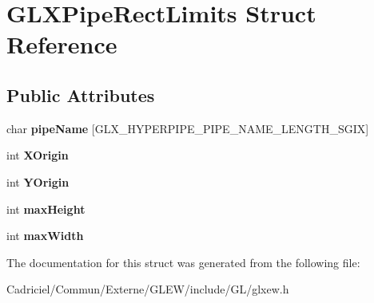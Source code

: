 \hypertarget{struct_g_l_x_pipe_rect_limits}{\section{G\-L\-X\-Pipe\-Rect\-Limits Struct Reference}
\label{struct_g_l_x_pipe_rect_limits}
}
\subsection*{Public Attributes}
\begin{DoxyCompactItemize}
\item 
\hypertarget{struct_g_l_x_pipe_rect_limits_ae78b4b6656101bc841946733a5b6e5ce}{char {\bfseries pipe\-Name} \mbox{[}G\-L\-X\-\_\-\-H\-Y\-P\-E\-R\-P\-I\-P\-E\-\_\-\-P\-I\-P\-E\-\_\-\-N\-A\-M\-E\-\_\-\-L\-E\-N\-G\-T\-H\-\_\-\-S\-G\-I\-X\mbox{]}}\label{struct_g_l_x_pipe_rect_limits_ae78b4b6656101bc841946733a5b6e5ce}

\item 
\hypertarget{struct_g_l_x_pipe_rect_limits_a3e5a965059d9f5d2ca42acd35af5bb9b}{int {\bfseries X\-Origin}}\label{struct_g_l_x_pipe_rect_limits_a3e5a965059d9f5d2ca42acd35af5bb9b}

\item 
\hypertarget{struct_g_l_x_pipe_rect_limits_a50e06bcf0dae95854be7d93a515199e9}{int {\bfseries Y\-Origin}}\label{struct_g_l_x_pipe_rect_limits_a50e06bcf0dae95854be7d93a515199e9}

\item 
\hypertarget{struct_g_l_x_pipe_rect_limits_a27572e499c0d3280031c2ad8e387c0c1}{int {\bfseries max\-Height}}\label{struct_g_l_x_pipe_rect_limits_a27572e499c0d3280031c2ad8e387c0c1}

\item 
\hypertarget{struct_g_l_x_pipe_rect_limits_a8662c7a712b30620e25fc994adf337a1}{int {\bfseries max\-Width}}\label{struct_g_l_x_pipe_rect_limits_a8662c7a712b30620e25fc994adf337a1}

\end{DoxyCompactItemize}


The documentation for this struct was generated from the following file\-:\begin{DoxyCompactItemize}
\item 
Cadriciel/\-Commun/\-Externe/\-G\-L\-E\-W/include/\-G\-L/glxew.\-h\end{DoxyCompactItemize}
